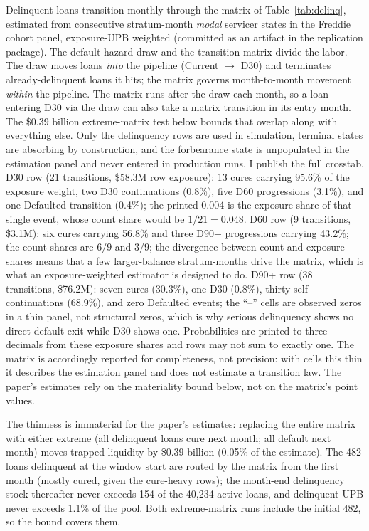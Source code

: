 \documentclass[12pt]{article}
\begin{document}
Delinquent loans transition monthly through the matrix of Table~\ref{tab:delinq}, estimated from consecutive stratum-month \emph{modal} servicer states in the Freddie cohort panel, exposure-UPB weighted (committed as an artifact in the replication package). The default-hazard draw and the transition matrix divide the labor. The draw moves loans \emph{into} the pipeline (Current $\to$ D30) and terminates already-delinquent loans it hits; the matrix governs month-to-month movement \emph{within} the pipeline. The matrix runs after the draw each month, so a loan entering D30 via the draw can also take a matrix transition in its entry month. The \$0.39 billion extreme-matrix test below bounds that overlap along with everything else. Only the delinquency rows are used in simulation, terminal states are absorbing by construction, and the forbearance state is unpopulated in the estimation panel and never entered in production runs.
I publish the full crosstab. D30 row (21 transitions, \$58.3M row exposure): 13 cures carrying 95.6\% of the exposure weight, two D30 continuations (0.8\%), five D60 progressions (3.1\%), and one Defaulted transition (0.4\%); the printed 0.004 is the exposure share of that single event, whose count share would be $1/21 = 0.048$. D60 row (9 transitions, \$3.1M): six cures carrying 56.8\% and three D90+ progressions carrying 43.2\%; the count shares are $6/9$ and $3/9$; the divergence between count and exposure shares means that a few larger-balance stratum-months drive the matrix, which is what an exposure-weighted estimator is designed to do. D90+ row (38 transitions, \$76.2M): seven cures (30.3\%), one D30 (0.8\%), thirty self-continuations (68.9\%), and zero Defaulted events; the ``--'' cells are observed zeros in a thin panel, not structural zeros, which is why serious delinquency shows no direct default exit while D30 shows one. Probabilities are printed to three decimals from these exposure shares and rows may not sum to exactly one. The matrix is accordingly reported for completeness, not precision: with cells this thin it describes the estimation panel and does not estimate a transition law. The paper's estimates rely on the materiality bound below, not on the matrix's point values.

The thinness is immaterial for the paper's estimates: replacing the entire matrix with either extreme (all delinquent loans cure next month; all default next month) moves trapped liquidity by \$0.39 billion (0.05\% of the estimate). The 482 loans delinquent at the window start are routed by the matrix from the first month (mostly cured, given the cure-heavy rows); the month-end delinquency stock thereafter never exceeds 154 of the 40,234 active loans, and delinquent UPB never exceeds 1.1\% of the pool. Both extreme-matrix runs include the initial 482, so the bound covers them.
\end{document}
